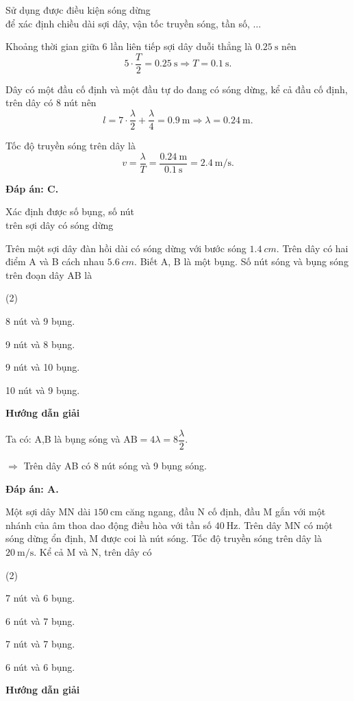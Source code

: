 \begin{dang}{Sử dụng được điều kiện sóng dừng\\ để xác định chiều dài sợi dây, vận tốc truyền sóng, tần số, $\ldots$}
{		Khoảng thời gian giữa 6 lần liên tiếp sợi dây duỗi thẳng là $\SI{0.25}{\second}$ nên
		$$5\cdot\dfrac{T}{2}=\SI{0.25}{\second}\Rightarrow T=\SI{0.1}{\second}.$$
		
		Dây có một đầu cố định và một đầu tự do đang có sóng dừng, kể cả đầu cố định, trên dây có 8 nút nên
		$$l=7\cdot\dfrac{\lambda}{2}+\dfrac{\lambda}{4}=\SI{0.9}{\meter}\Rightarrow\lambda=\SI{0.24}{\meter}.$$
		
		Tốc độ truyền sóng trên dây là
		$$v=\dfrac{\lambda}{T}=\dfrac{\SI{0.24}{\meter}}{\SI{0.1}{\second}}=\SI{2.4}{\meter/\second}.$$
		
		\textbf{Đáp án: C.}}
\end{dang}
\begin{dang}{Xác định được số bụng, số nút\\ trên sợi dây có sóng dừng}
	{Trên một sợi dây đàn hồi dài có sóng dừng với bước sóng $\SI{1.4}{cm}$. Trên dây có hai điểm A và B cách nhau $\SI{5.6}{cm}$. Biết A, B là một bụng. Số nút sóng và bụng sóng trên đoạn dây AB là
		\begin{mcq}(2)
			\item 8 nút và 9 bụng.
			\item 9 nút và 8 bụng.
			\item 9 nút và 10 bụng.
			\item 10 nút và 9 bụng.
		\end{mcq}
	}
	{
		\begin{center}
			\textbf{Hướng dẫn giải}
		\end{center}
		
		Ta có: A,B là bụng sóng và $\text{AB}=4\lambda=8\dfrac{\lambda}{2}.$
		
		$\Rightarrow $ Trên dây AB có 8 nút sóng và 9 bụng sóng.
		
		\textbf{Đáp án: A.}
	}
	{Một sợi dây MN dài $\SI{150}{\centi\meter}$ căng ngang, đầu N cố định, đầu M gắn với một nhánh của âm thoa dao động điều hòa với tần số $\SI{40}{\hertz}$. Trên dây MN có một sóng dừng ổn định, M được coi là nút sóng. Tốc độ truyền sóng trên dây là $\SI{20}{\meter/\second}$. Kể cả M và N, trên dây có
		\begin{mcq}(2)
			\item 7 nút và 6 bụng.
			\item 6 nút và 7 bụng.
			\item 7 nút và 7 bụng.
			\item 6 nút và 6 bụng.
		\end{mcq}
	}
	{
		\begin{center}
			\textbf{Hướng dẫn giải}
		\end{center}
		
}
\end{dang}
